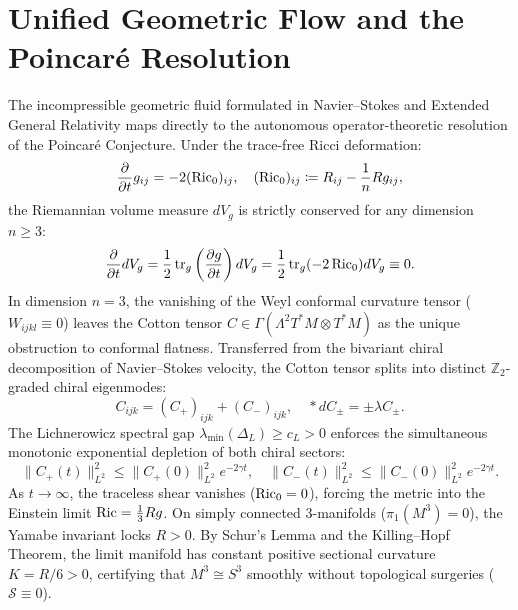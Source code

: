 
\section{Unified Geometric Flow and the Poincaré Resolution}
\label{part-4:sec:poincare-unification}

The incompressible geometric fluid formulated in Navier--Stokes and Extended General Relativity maps directly to the autonomous operator-theoretic resolution of the Poincaré Conjecture. Under the trace-free Ricci deformation:
\begin{equation}
    \label{eq:traceless_flow_gr}
    \frac{\partial}{\partial t} g_{ij} = -2 (\operatorname{Ric}_0)_{ij}, \quad (\operatorname{Ric}_0)_{ij} \coloneqq R_{ij} - \frac{1}{n} R g_{ij},
\end{equation}
the Riemannian volume measure $dV_g$ is strictly conserved for any dimension $n \ge 3$:
\begin{equation}
    \frac{\partial}{\partial t} dV_g = \frac{1}{2} \operatorname{tr}_g \left( \frac{\partial g}{\partial t} \right) dV_g = \frac{1}{2} \operatorname{tr}_g (-2\operatorname{Ric}_0) dV_g \equiv 0.
\end{equation}
In dimension $n=3$, the vanishing of the Weyl conformal curvature tensor ($W_{ijkl} \equiv 0$) leaves the Cotton tensor $C \in \Gamma(\Lambda^2 T^* M \otimes T^* M)$ as the unique obstruction to conformal flatness. Transferred from the bivariant chiral decomposition of Navier--Stokes velocity, the Cotton tensor splits into distinct $\mathbb{Z}_2$-graded chiral eigenmodes:
\begin{equation}
    C_{ijk} = (C_+)_{ijk} + (C_-)_{ijk}, \quad *d C_\pm = \pm \lambda C_\pm.
\end{equation}
The Lichnerowicz spectral gap $\lambda_{\min}(\Delta_L) \ge c_L > 0$ enforces the simultaneous monotonic exponential depletion of both chiral sectors:
\begin{equation}
    \|C_+(t)\|_{L^2}^2 \le \|C_+(0)\|_{L^2}^2 e^{-2\gamma t}, \quad \|C_-(t)\|_{L^2}^2 \le \|C_-(0)\|_{L^2}^2 e^{-2\gamma t}.
\end{equation}
As $t \to \infty$, the traceless shear vanishes ($\operatorname{Ric}_0 = 0$), forcing the metric into the Einstein limit $\operatorname{Ric} = \frac{1}{3} R g$. On simply connected 3-manifolds ($\pi_1(M^3) = 0$), the Yamabe invariant locks $R > 0$. By Schur's Lemma and the Killing--Hopf Theorem, the limit manifold has constant positive sectional curvature $K = R/6 > 0$, certifying that $M^3 \cong S^3$ smoothly without topological surgeries ($\mathcal{S} \equiv 0$).

